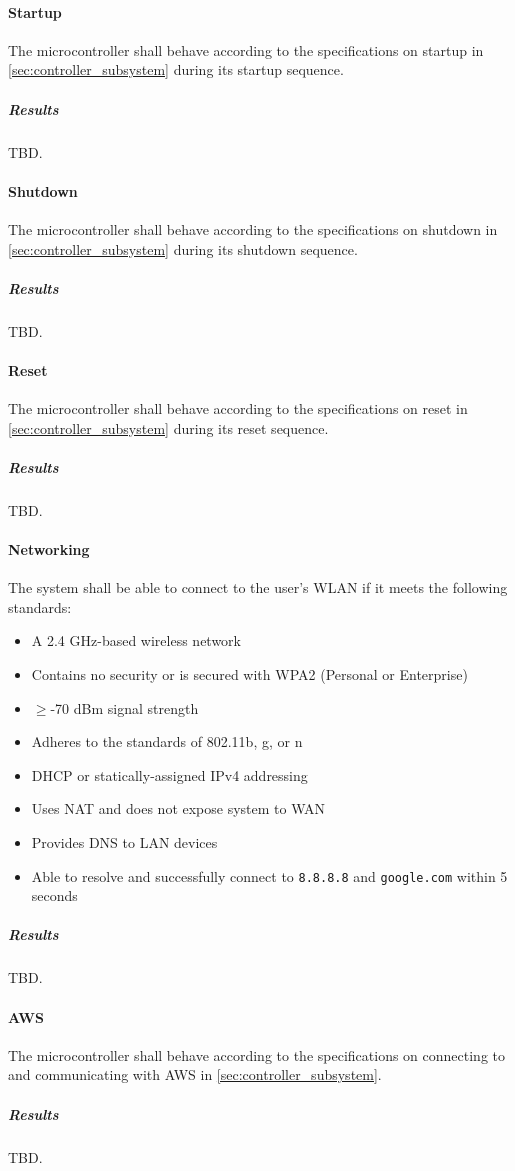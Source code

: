 \paragraph{Startup} The microcontroller shall behave according to the specifications on startup in \autoref{sec:controller_subsystem} during its startup sequence.
\subparagraph{Results} TBD.

\paragraph{Shutdown} The microcontroller shall behave according to the specifications on shutdown in \autoref{sec:controller_subsystem} during its shutdown sequence.
\subparagraph{Results} TBD.

\paragraph{Reset} The microcontroller shall behave according to the specifications on reset in \autoref{sec:controller_subsystem} during its reset sequence.
\subparagraph{Results} TBD.

\paragraph{Networking} The system shall be able to connect to the user's WLAN if it meets the following standards:
\begin{itemize}
    \item A 2.4 GHz-based wireless network
    \item Contains no security or is secured with WPA2 (Personal or Enterprise)
    \item $\geq$-70 dBm signal strength
    \item Adheres to the standards of 802.11b, g, or n
    \item DHCP or statically-assigned IPv4 addressing
    \item Uses NAT and does not expose system to WAN
    \item Provides DNS to LAN devices
    \item Able to resolve and successfully connect to \texttt{8.8.8.8} and \texttt{google.com} within 5 seconds
\end{itemize}
\subparagraph{Results} TBD.

\paragraph{AWS} The microcontroller shall behave according to the specifications on connecting to and communicating with AWS in \autoref{sec:controller_subsystem}.
\subparagraph{Results} TBD.

